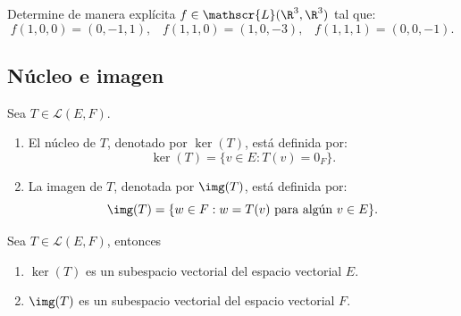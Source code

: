 \documentclass[compacto,10pt]{pubciencias-notas}
\begin{document}
\begin{ejer}
Determine de manera explícita $f \in \mathscr{L}(\R^{3}, \R^3)$ tal que:
\[
    f(1, 0, 0) = (0,-1,1), \;\;\; f(1, 1, 0) = (1,0,-3), \;\;\; f(1, 1, 1) = (0,0,-1).
\]
\end{ejer}
\setcounter{subsection}{2}
\subsection{Núcleo e imagen}

\begin{defi}
    Sea $T \in \mathscr{L}(E,F)$.
    \begin{enumerate}
    \item 
        El núcleo de $T$, denotado por $\ker(T)$, está definida por:
        \[
            \ker(T) = \{v \in E: T(v) = 0_{F}\}.
        \]
    \item 
        La imagen de $T$, denotada por $\img(T)$, está definida por:
        \[
            \img(T) = \{ w \in F: w = T(v) \text{ para algún } v \in E\}.
        \]
    \end{enumerate}
\end{defi}

\begin{prop}
    Sea $T \in \mathscr{L}(E,F)$, entonces
    \begin{enumerate}
    \item 
        $\ker(T)$ es un subespacio vectorial del espacio vectorial $E$.
    \item 
        $\img(T)$ es un subespacio vectorial del espacio vectorial $F$.
    \end{enumerate}
\end{prop}
\end{document}
